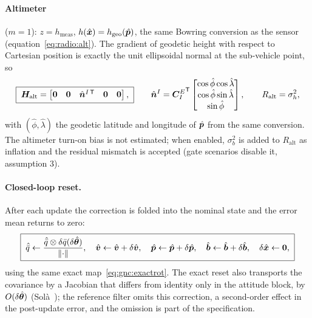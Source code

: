 \paragraph{Altimeter} ($m = 1$): $z = h_{\mathrm{meas}}$, $h(\hat{\bm{x}})
= h_{\mathrm{geo}}(\hat{\bm{p}})$, the same Bowring conversion as the
sensor (equation~\eqref{eq:radio:alt}). The gradient of geodetic height
with respect to Cartesian position is exactly the unit ellipsoidal
normal at the sub-vehicle point, so
\begin{equation}
  \boxed{\;
  \bm{H}_{\mathrm{alt}} =
  \begin{bmatrix}
    \bm{0} & \bm{0} & \hat{\bm{n}}^{I\,\mathsf T} & \bm{0} & \bm{0}
  \end{bmatrix},
  \;}
  \qquad
  \hat{\bm{n}}^{I} = {\bm{C}_{I}^{E}}^{\mathsf T}
  \begin{bmatrix}
    \cos\hat\phi\cos\hat\lambda \\
    \cos\hat\phi\sin\hat\lambda \\
    \sin\hat\phi
  \end{bmatrix},
  \qquad
  R_{\mathrm{alt}} = \sigma_h^2 ,
  \label{eq:ekf:altH}
\end{equation}
with $(\hat\phi, \hat\lambda)$ the geodetic latitude and longitude of
$\hat{\bm{p}}$ from the same conversion. The altimeter turn-on bias is
not estimated; when enabled, $\sigma_b^2$ is added to $R_{\mathrm{alt}}$
as inflation and the residual mismatch is accepted (gate scenarios
disable it, assumption 3).

\paragraph{Closed-loop reset.} After each update the correction is
folded into the nominal state and the error mean returns to zero:
\begin{equation}
  \boxed{\;
  \hat{\bar{q}} \leftarrow \frac{\hat{\bar{q}} \otimes
    \delta\bar{q}(\delta\hat{\bm{\theta}})}{\left\lVert \cdot \right\rVert},
  \quad
  \hat{\bm{v}} \leftarrow \hat{\bm{v}} + \delta\hat{\bm{v}},
  \quad
  \hat{\bm{p}} \leftarrow \hat{\bm{p}} + \delta\hat{\bm{p}},
  \quad
  \hat{\bm{b}} \leftarrow \hat{\bm{b}} + \delta\hat{\bm{b}},
  \quad
  \delta\hat{\bm{x}} \leftarrow \bm{0},
  \;}
  \label{eq:ekf:reset}
\end{equation}
using the same exact map~\eqref{eq:gnc:exactrot}. The exact reset also
transports the covariance by a Jacobian that differs from identity only
in the attitude block, by $O(\delta\hat{\bm{\theta}})$
(Sol\`a~\cite{sola2017}); the reference filter omits this correction,
a second-order effect in the post-update error, and the omission is
part of the specification.

